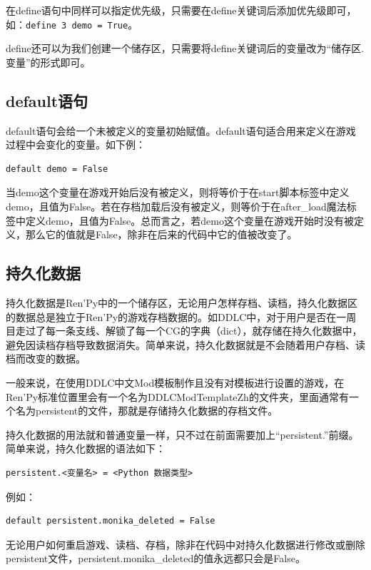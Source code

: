 \documentclass[../../Main.tex]{subfiles}
\begin{document}
\begin{ExtraKnowledge}
    在define语句中同样可以指定优先级，只需要在define关键词后添加优先级即可，如：\verb|define 3 demo = True|。
\end{ExtraKnowledge}

define还可以为我们创建一个储存区，只需要将define关键词后的变量改为“储存区.变量”的形式即可。

\subsection{default语句}
default语句会给一个未被定义的变量初始赋值。default语句适合用来定义在游戏过程中会变化的变量。如下例：
\begin{lstlisting}[numbers=none]
default demo = False
\end{lstlisting}

当demo这个变量在游戏开始后没有被定义，则将等价于在start脚本标签中定义demo，且值为False。若在存档加载后没有被定义，则等价于在after\_load魔法标签中定义demo，且值为False。总而言之，若demo这个变量在游戏开始时没有被定义，那么它的值就是False，除非在后来的代码中它的值被改变了。

\subsection{持久化数据}

持久化数据是Ren'Py中的一个储存区，无论用户怎样存档、读档，持久化数据区的数据总是独立于Ren'Py的游戏存档数据的。如DDLC中，对于用户是否在一周目走过了每一条支线、解锁了每一个CG的字典（dict），就存储在持久化数据中，避免因读档存档导致数据消失。简单来说，持久化数据就是不会随着用户存档、读档而改变的数据。

一般来说，在使用DDLC中文Mod模板制作且没有对模板进行设置的游戏，在Ren'Py标准位置里会有一个名为DDLCModTemplateZh的文件夹，里面通常有一个名为persistent的文件，那就是存储持久化数据的存档文件。

持久化数据的用法就和普通变量一样，只不过在前面需要加上“persistent.”前缀。简单来说，持久化数据的语法如下：

\begin{lstlisting}
persistent.<变量名> = <Python 数据类型>
\end{lstlisting}

例如：
\begin{lstlisting}
default persistent.monika_deleted = False
\end{lstlisting}

无论用户如何重启游戏、读档、存档，除非在代码中对持久化数据进行修改或删除persistent文件，persistent.monika\_deleted的值永远都只会是False。
\end{document}
